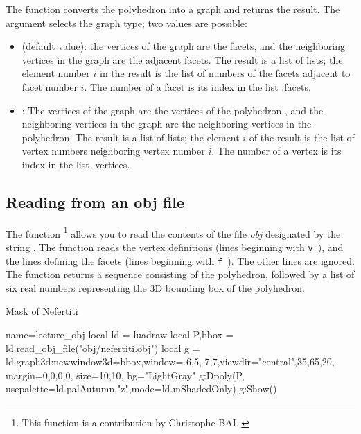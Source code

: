 The function  converts the polyhedron  into a graph and returns the result. The argument  selects the graph type; two values ​​are possible:
\begin{itemize}
    \item {} (default value): the vertices of the graph are the facets, and the neighboring vertices in the graph are the adjacent facets. The result is a list of lists; the element number $i$ in the result is the list of numbers of the facets adjacent to facet number $i$. The number of a facet is its index in the list .facets.

    \item {}: The vertices of the graph are the vertices of the polyhedron , and the neighboring vertices in the graph are the neighboring vertices in the polyhedron. The result is a list of lists; the element $i$ of the result is the list of vertex numbers neighboring vertex number $i$. The number of a vertex is its index in the list .vertices.
\end{itemize}


\subsection{Reading from an obj file}

The function \footnote{This function is a contribution by Christophe BAL.} allows you to read the contents of the file \emph{obj} designated by the string . The function reads the vertex definitions (lines beginning with \verb|v |), and the lines defining the facets (lines beginning with \verb|f |). The other lines are ignored. The function returns a sequence consisting of the polyhedron, followed by a list of six real numbers  representing the 3D bounding box of the polyhedron.

\begin{demo}{Mask of Nefertiti}
\begin{luadraw}{name=lecture_obj}
local ld = luadraw
local P,bbox = ld.read_obj_file("obj/nefertiti.obj")
local g = ld.graph3d:new{window3d=bbox,window={-6,5,-7,7},viewdir={"central",35,65,20},
margin={0,0,0,0}, size={10,10}, bg="LightGray"}
g:Dpoly(P, {usepalette={ld.palAutumn,"z"},mode=ld.mShadedOnly})
g:Show()
\end{luadraw}
\end{demo}

